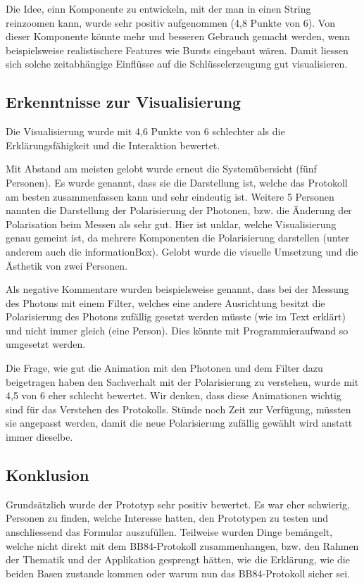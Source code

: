 \documentclass[a4paper,10.2pt,pdftex]{scrartcl}%
\begin{document}
Die Idee, einn Komponente zu entwickeln, mit der man in einen String reinzoomen kann, wurde sehr positiv aufgenommen (4,8 Punkte von 6). Von dieser Komponente könnte mehr und besseren Gebrauch gemacht werden, wenn beispielsweise realistischere Features wie Bursts eingebaut wären. Damit liessen sich solche zeitabhängige Einflüsse auf die Schlüsselerzeugung gut visualisieren.
\subsection{Erkenntnisse zur Visualisierung}
Die Visualisierung wurde mit 4,6 Punkte von 6 schlechter als die Erklärungsfähigkeit und die Interaktion bewertet.

Mit Abstand am meisten gelobt wurde erneut die Systemübersicht (fünf Personen). Es wurde genannt, dass sie die Darstellung ist, welche das Protokoll am besten zusammenfassen kann und sehr eindeutig ist. Weitere 5 Personen nannten die Darstellung der Polarisierung der Photonen, bzw. die Änderung der Polarisation beim Messen als sehr gut. Hier ist unklar, welche Visualisierung genau gemeint ist, da mehrere Komponenten die Polarisierung darstellen (unter anderem auch die informationBox). Gelobt wurde die visuelle Umsetzung und die Ästhetik von zwei Personen.

Als negative Kommentare wurden beispielsweise genannt, dass bei der Messung des Photons mit einem Filter, welches eine andere Ausrichtung besitzt die Polarisierung des Photons zufällig gesetzt werden müsste (wie im Text erklärt) und nicht immer gleich (eine Person). Dies könnte mit Programmieraufwand so umgesetzt werden.

Die Frage, wie gut die Animation mit den Photonen und dem Filter dazu beigetragen haben den Sachverhalt mit der Polarisierung zu verstehen, wurde mit 4,5 von 6 eher schlecht bewertet. Wir denken, dass diese Animationen wichtig sind für das Verstehen des Protokolls. Stünde noch Zeit zur Verfügung, müssten sie angepasst werden, damit die neue Polarisierung zufällig gewählt wird anstatt immer dieselbe.
\newpage
\subsection{Konklusion}
Grundsätzlich wurde der Prototyp sehr positiv bewertet. Es war eher schwierig, Personen zu finden, welche Interesse hatten, den Prototypen zu testen und anschliessend das Formular auszufüllen. Teilweise wurden Dinge bemängelt, welche nicht direkt mit dem BB84-Protokoll zusammenhangen, bzw. den Rahmen der Thematik und der Applikation gesprengt hätten, wie die Erklärung, wie die beiden Basen zustande kommen oder warum nun das BB84-Protokoll sicher sei.
\end{document}
